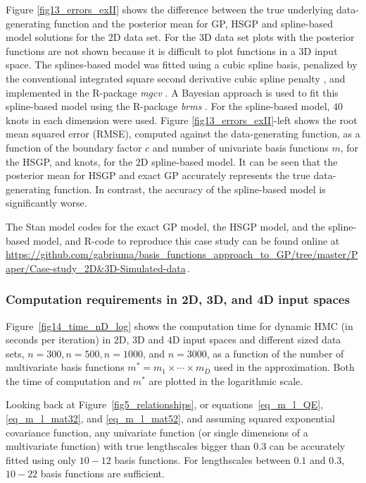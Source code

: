 Figure \ref{fig13_errors_exII} shows the difference  between the true underlying data-generating function and the posterior mean for GP, HSGP and spline-based model solutions for the $2$D data set. For the $3$D data set plots with the posterior functions are not shown because it is difficult to plot functions in a $3$D input space. The splines-based model was fitted using a cubic spline basis, penalized by the conventional integrated square second derivative cubic spline penalty \citep{wood2017generalized}, and implemented in the R-package \textit{mgcv} \citep{wood2011mgcv}. A Bayesian approach is used to fit this spline-based model using the R-package \textit{brms} \citep{burkner2017brms}. For the spline-based model, $40$ knots in each dimension were used. Figure \ref{fig13_errors_exII}-left shows the root mean squared error (RMSE), computed against the data-generating function, as a function of the boundary factor $c$ and number of univariate basis functions $m$, for the HSGP, and knots, for the $2$D spline-based model. It can be seen that the posterior mean for HSGP and exact GP accurately represents the true data-generating function. In contrast, the accuracy of the spline-based model is significantly worse. 

The Stan model codes for the exact GP model, the HSGP model, and the spline-based model, and R-code to reproduce this case study can be found online at {\small \url{https://github.com/gabriuma/basis_functions_approach_to_GP/tree/master/Paper/Case-study_2D&3D-Simulated-data}}\,.

\subsubsection{Computation requirements in 2D, 3D, and 4D input spaces}\label{sec_computation_nD}

Figure~\ref{fig14_time_nD_log} shows the computation time for dynamic HMC (in seconds per iteration) in $2$D, $3$D and $4$D input spaces and different sized data sets, $n=300, n=500, n=1000$, and $n=3000$, as a function of the number of multivariate basis functions $m^*=m_1\times \cdots \times m_D$ used in the approximation.
Both the time of computation and $m^*$ are plotted in the logarithmic scale. 

Looking back at Figure~\ref{fig5_relationships}, or equations~\eqref{eq_m_l_QE}, \eqref{eq_m_l_mat32}, and \eqref{eq_m_l_mat52}, and assuming squared exponential covariance function, any univariate function (or single dimensions of a multivariate function) with true lengthscales bigger than $0.3$ can be accurately fitted using only $10-12$ basis functions. For lengthscales between $0.1$ and $0.3$, $10-22$ basis functions are sufficient.

